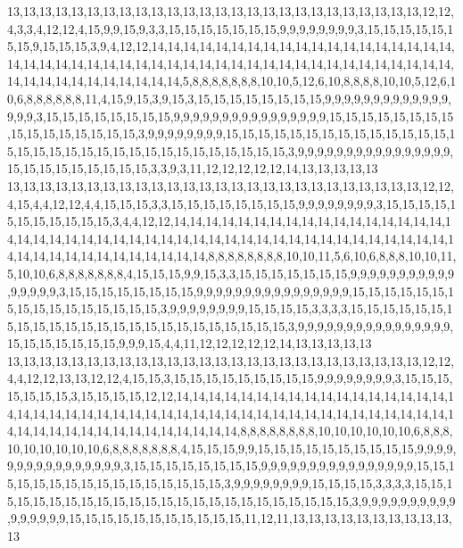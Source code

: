 13,13,13,13,13,13,13,13,13,13,13,13,13,13,13,13,13,13,13,13,13,13,13,13,13,13,12,12,4,3,3,4,12,12,4,15,9,9,15,9,3,3,15,15,15,15,15,15,15,9,9,9,9,9,9,9,9,3,15,15,15,15,15,15,15,9,15,15,15,3,9,4,12,12,14,14,14,14,14,14,14,14,14,14,14,14,14,14,14,14,14,14,14,14,14,14,14,14,14,14,14,14,14,14,14,14,14,14,14,14,14,14,14,14,14,14,14,14,14,14,14,14,14,14,14,14,14,14,14,14,14,14,5,8,8,8,8,8,8,8,10,10,5,12,6,10,8,8,8,8,10,10,5,12,6,10,6,8,8,8,8,8,8,11,4,15,9,15,3,9,15,3,15,15,15,15,15,15,15,15,9,9,9,9,9,9,9,9,9,9,9,9,9,9,9,9,3,15,15,15,15,15,15,15,15,9,9,9,9,9,9,9,9,9,9,9,9,9,9,9,9,15,15,15,15,15,15,15,15,15,15,15,15,15,15,15,15,3,9,9,9,9,9,9,9,9,15,15,15,15,15,15,15,15,15,15,15,15,15,15,15,15,15,15,15,15,15,15,15,15,15,15,15,15,15,15,15,15,3,9,9,9,9,9,9,9,9,9,9,9,9,9,9,9,9,15,15,15,15,15,15,15,15,15,3,3,9,3,11,12,12,12,12,12,14,13,13,13,13,13
13,13,13,13,13,13,13,13,13,13,13,13,13,13,13,13,13,13,13,13,13,13,13,13,13,13,12,12,4,15,4,4,12,12,4,4,15,15,15,3,3,15,15,15,15,15,15,15,15,9,9,9,9,9,9,9,9,3,15,15,15,15,15,15,15,15,15,15,15,3,4,4,12,12,14,14,14,14,14,14,14,14,14,14,14,14,14,14,14,14,14,14,14,14,14,14,14,14,14,14,14,14,14,14,14,14,14,14,14,14,14,14,14,14,14,14,14,14,14,14,14,14,14,14,14,14,14,14,14,14,14,14,8,8,8,8,8,8,8,8,10,10,11,5,6,10,6,8,8,8,10,10,11,5,10,10,6,8,8,8,8,8,8,8,4,15,15,15,9,9,15,3,3,15,15,15,15,15,15,15,9,9,9,9,9,9,9,9,9,9,9,9,9,9,9,9,3,15,15,15,15,15,15,15,15,9,9,9,9,9,9,9,9,9,9,9,9,9,9,9,9,15,15,15,15,15,15,15,15,15,15,15,15,15,15,15,15,3,9,9,9,9,9,9,9,9,15,15,15,15,3,3,3,3,15,15,15,15,15,15,15,15,15,15,15,15,15,15,15,15,15,15,15,15,15,15,15,15,3,9,9,9,9,9,9,9,9,9,9,9,9,9,9,9,9,15,15,15,15,15,15,15,9,9,9,15,4,4,11,12,12,12,12,12,14,13,13,13,13,13
13,13,13,13,13,13,13,13,13,13,13,13,13,13,13,13,13,13,13,13,13,13,13,13,13,13,12,12,4,4,12,12,13,13,12,12,4,15,15,3,15,15,15,15,15,15,15,15,15,9,9,9,9,9,9,9,9,3,15,15,15,15,15,15,15,3,15,15,15,15,12,12,14,14,14,14,14,14,14,14,14,14,14,14,14,14,14,14,14,14,14,14,14,14,14,14,14,14,14,14,14,14,14,14,14,14,14,14,14,14,14,14,14,14,14,14,14,14,14,14,14,14,14,14,14,14,14,14,14,14,14,14,8,8,8,8,8,8,8,8,10,10,10,10,10,10,6,8,8,8,10,10,10,10,10,10,6,8,8,8,8,8,8,8,4,15,15,15,9,9,15,15,15,15,15,15,15,15,15,15,9,9,9,9,9,9,9,9,9,9,9,9,9,9,9,9,3,15,15,15,15,15,15,15,15,9,9,9,9,9,9,9,9,9,9,9,9,9,9,9,9,15,15,15,15,15,15,15,15,15,15,15,15,15,15,15,15,3,9,9,9,9,9,9,9,9,15,15,15,15,3,3,3,3,15,15,15,15,15,15,15,15,15,15,15,15,15,15,15,15,15,15,15,15,15,15,15,15,3,9,9,9,9,9,9,9,9,9,9,9,9,9,9,9,9,15,15,15,15,15,15,15,15,15,15,15,11,12,11,13,13,13,13,13,13,13,13,13,13,13
